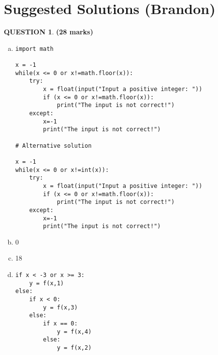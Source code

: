 \documentclass[a4paper,12pt]{article}
\theoremstyle{definition}
\newtheorem{ques}[dummy]{QUESTION}
\theoremstyle{plain}
\newcommand{\py}{python}
\begin{document}
\section*{Suggested Solutions (Brandon)}
\begin{ques}\hfill\textbf{(28 marks)}\\
	\begin{enumerate}[(a)]
		\item 
		\begin{verbatim}
import math

x = -1
while(x <= 0 or x!=math.floor(x)):
    try:
        x = float(input("Input a positive integer: "))
        if (x <= 0 or x!=math.floor(x)):
            print("The input is not correct!")
    except:
        x=-1
        print("The input is not correct!")

# Alternative solution

x = -1
while(x <= 0 or x!=int(x)):
    try:
        x = float(input("Input a positive integer: "))
        if (x <= 0 or x!=math.floor(x)):
            print("The input is not correct!")
    except:
        x=-1
        print("The input is not correct!")
		\end{verbatim}
		\item 0
		\item 18
		\item 
\begin{verbatim}
if x < -3 or x >= 3:
    y = f(x,1)
else:
    if x < 0:
        y = f(x,3)
    else:
        if x == 0:
            y = f(x,4)
        else:
            y = f(x,2)
\end{verbatim}
	\end{enumerate}
\end{ques}
\end{document}
